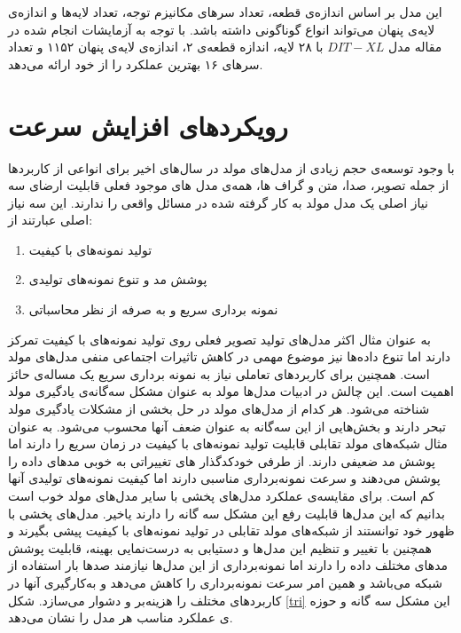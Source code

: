 این مدل بر اساس اندازه‌ی قطعه، تعداد سرهای مکانیزم توجه، تعداد لایه‌ها و اندازه‌ی لایه‌ی پنهان می‌تواند انواع گوناگونی داشته باشد. با توجه به آزمایشات انجام شده در مقاله \cite{peebles2023scalable} مدل $DIT-XL$ با ۲۸ لایه، اندازه قطعه‌ی ۲، اندازه‌ی لایه‌ی پنهان ۱۱۵۲ و تعداد سرهای ۱۶ بهترین عملکرد را از خود ارائه می‌دهد.


\section{رویکرد‌های افزایش سرعت}

با وجود توسعه‌ی حجم زیادی از مدل‌های مولد در سال‌های اخیر برای انواعی از کاربردها از جمله تصویر، صدا، متن و گراف ها، همه‌‌ی مدل های موجود فعلی قابلیت ارضای سه نیاز اصلی یک مدل مولد به کار گرفته شده در مسائل واقعی را ندارند\cite{xiao2021tackling}. این سه نیاز اصلی عبارتند از:
\begin{enumerate}
	\item
	تولید نمونه‌های با کیفیت
	\item
	پوشش مد و تنوع نمونه‌های تولیدی 
	\item
	نمونه برداری سریع و به صرفه از نظر محاسباتی
\end{enumerate}

به عنوان مثال اکثر مدل‌های تولید تصویر فعلی روی تولید نمونه‌های با کیفیت تمرکز دارند اما تنوع داده‌ها نیز موضوع مهمی در کاهش تاثیرات اجتماعی منفی مدل‌های مولد است. همچنین برای کاربردهای تعاملی نیاز به نمونه برداری سریع یک مساله‌ی حائز اهمیت است. این چالش در ادبیات مدل‌ها مولد به عنوان مشکل سه‌گانه‌ی یادگیری مولد شناخته می‌شود\cite{xiao2021tackling}.
هر کدام از مدل‌های مولد در حل بخشی از مشکلات یادگیری مولد تبحر دارند و بخش‌هایی از این سه‌گانه به عنوان ضعف آنها محسوب می‌شود. به عنوان مثال شبکه‌های مولد تقابلی قابلیت تولید نمونه‌های با کیفیت در زمان سریع را دارند اما پوشش مد ضعیفی دارند. از طرفی خودکدگذار های تغییراتی به خوبی مدهای داده را پوشش می‌دهند و سرعت نمونه‌برداری مناسبی دارند اما کیفیت نمونه‌های تولیدی آنها کم است.
برای مقایسه‌ی عملکرد مدل‌های پخشی با سایر مدل‌های مولد خوب است بدانیم که این مدل‌ها قابلیت رفع این مشکل سه گانه را دارند یاخیر. مدل‌های پخشی با ظهور خود توانستند از شبکه‌های مولد تقابلی در تولید نمونه‌های با کیفیت پیشی بگیرند و همچنین با تغییر و تنظیم این مدل‌ها و دستیابی به درست‌نمایی بهینه، قابلیت پوشش مدهای مختلف داده را دارند اما نمونه‌برداری از این مدل‌ها نیازمند صد‌ها بار استفاده از شبکه می‌باشد و همین امر سرعت نمونه‌برداری را کاهش می‌دهد و به‌کارگیری آنها در کاربردهای مختلف  را هزینه‌بر و دشوار می‌سازد. شکل \ref{tri} این مشکل سه گانه و حوزه ی عملکرد مناسب هر مدل را نشان می‌دهد.

